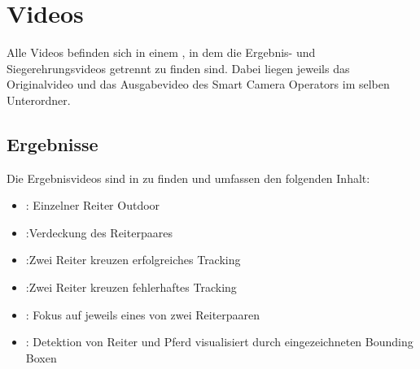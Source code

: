 \chapter{Videos}

Alle Videos befinden sich in einem
\href{https://uni-muenster.sciebo.de/s/FCpRRcPnGg2HgHa}{\color{blue}{Sciebo-Ordner}}
, in dem die Ergebnis- und Siegerehrungsvideos getrennt zu finden sind.
Dabei liegen jeweils das Originalvideo und das Ausgabevideo des Smart Camera Operators im selben Unterordner.
\section{Ergebnisse}
Die Ergebnisvideos sind in \href{https://uni-muenster.sciebo.de/s/lxt2GXVMTPt4Q6r}{\color{blue}{hier}} zu finden und umfassen den folgenden Inhalt:
\begin{itemize}
\item \label{Video1} \href{https://uni-muenster.sciebo.de/s/5kyXkH1xph6GRwV}{\color{blue}{Video1}}:
Einzelner Reiter Outdoor

\item \label{Video2} \href{https://uni-muenster.sciebo.de/s/Q05qF4aXpzrJ9gg}{\color{blue}{Video2}}:Verdeckung des Reiterpaares

\item \label{Video3} \href{https://uni-muenster.sciebo.de/s/jNPz6dOj8KgaNg0}{\color{blue}{Video3}}:Zwei Reiter kreuzen erfolgreiches Tracking

\item \label{Video4} \href{https://uni-muenster.sciebo.de/s/f6pl4ZjFE5cmdu3}{\color{blue}{Video4}}:Zwei Reiter kreuzen fehlerhaftes Tracking

\item \label{Video5} \href{https://uni-muenster.sciebo.de/s/1PTl9dlBgHArqcX}{\color{blue}{Video5}}:
Fokus auf jeweils eines von zwei Reiterpaaren

\item \label{Video6} \href{https://uni-muenster.sciebo.de/s/mGSYwquv9N4PuhS}{\color{blue}{Video6}}:
Detektion von Reiter und Pferd visualisiert durch eingezeichneten Bounding Boxen
\end{itemize}
